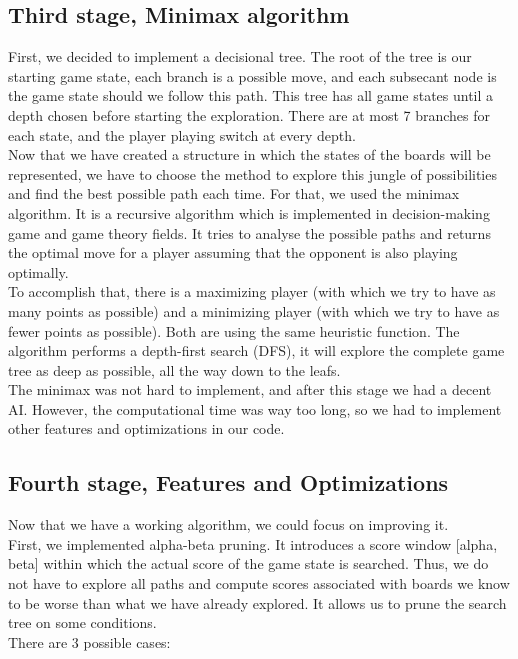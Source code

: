 \documentclass[12pt, a4paper, oneside]{report}
\begin{document}
	\subsection{Third stage, Minimax algorithm}

	First, we decided to implement a decisional tree. The root of the tree is our starting game state, each branch is a possible move, and each subsecant node is the game state should we follow this path. This tree has all game states until a depth chosen before starting the exploration. There are at most 7 branches for each state, and the player playing switch at every depth. \\

	Now that we have created a structure in which the states of the boards will be represented, we have to choose the method to explore this jungle of possibilities and find the best possible path each time. For that, we used the minimax algorithm. It is a recursive algorithm which is implemented in decision-making game and game theory fields. It tries to analyse the possible paths and returns the optimal move for a player assuming that the opponent is also playing optimally. \\

	To accomplish that, there is a maximizing player (with which we try to have as many points as possible) and a minimizing player (with which we try to have as fewer points as possible). Both are using the same heuristic function. The algorithm performs a depth-first search (DFS), it will explore the complete game tree as deep as possible, all the way down to the leafs. \\
	The minimax was not hard to implement, and after this stage we had a decent AI. However, the computational time was way too long, so we had to implement other features and optimizations in our code. \\

	\subsection{Fourth stage, Features and Optimizations}
	Now that we have a working algorithm, we could focus on improving it. \\

	First, we implemented alpha-beta pruning. It introduces a score window [alpha, beta] within which the actual score of the game state is searched. Thus, we do not have to explore all paths and compute scores associated with boards we know to be worse than what we have already explored. It allows us to prune the search tree on some conditions. \\
	There are 3 possible cases:
\end{document}
